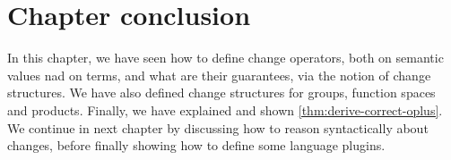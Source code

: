 \section{Chapter conclusion}
In this chapter, we have seen how to define change operators, both on semantic
values nad on terms, and what are their guarantees, via the notion of change
structures. We have also defined change structures for groups, function spaces
and products. Finally, we have explained and shown
\cref{thm:derive-correct-oplus}.
We continue in next chapter by discussing how to reason syntactically about
changes, before finally showing how to define some language plugins.








